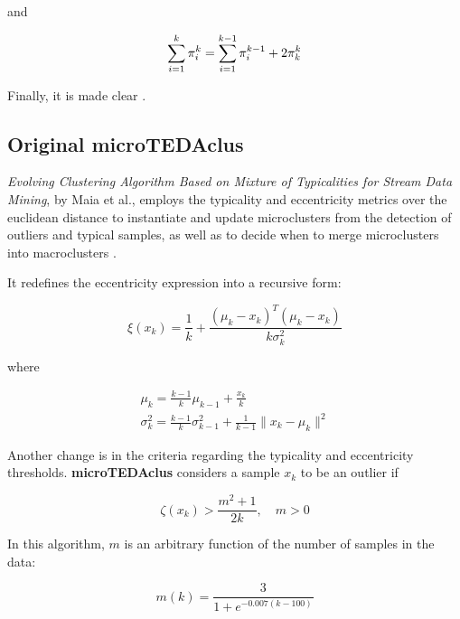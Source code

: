 \documentclass[a4paper]{article}
\begin{document}
and

\begin{equation}
    \sum_{i=1}^{k} \pi^k_i = \sum_{i=1}^{k-1} \pi^{k-1}_i + 2 \pi^k_k \\
\end{equation}

Finally, it is made clear  \cite{mahalanobis2018generalized}.

\subsection{Original microTEDAclus}

\textit{Evolving Clustering Algorithm Based on Mixture of Typicalities for Stream Data Mining}, by Maia et al., employs the typicality and eccentricity metrics over the euclidean distance to instantiate and update microclusters from the detection of outliers and typical samples, as well as to decide when to merge microclusters into macroclusters \cite{maia2020evolvclus}.

It redefines the eccentricity expression into a recursive form:

\begin{equation}
    \xi(x_k) = \frac{1}{k} + \frac{\left( \mu_k - x_k \right)^T \left( \mu_k - x_k \right)}{k \sigma^2_k}
\end{equation}

where

\begin{gather}
    \mu_k = \frac{k - 1}{k} \mu_{k-1} + \frac{x_k}{k} \\
    \sigma^2_k = \frac{k - 1}{k} \sigma^2_{k-1} + \frac{1}{k - 1} \lVert x_k - \mu_k \rVert^2
\end{gather}

Another change is in the criteria regarding the typicality and eccentricity thresholds. \textbf{microTEDAclus} considers a sample $x_k$ to be an outlier if

\begin{equation}
    \zeta(x_k) > \frac{m^2 + 1}{2k}, \quad m > 0 \label{eq:angelovs_outlier}
\end{equation}

In this algorithm, $m$ is an arbitrary function of the number of samples in the data:

\begin{equation}
    m(k) = \frac{3}{1 + e^{-0.007(k - 100)}}
\end{equation}
\end{document}
